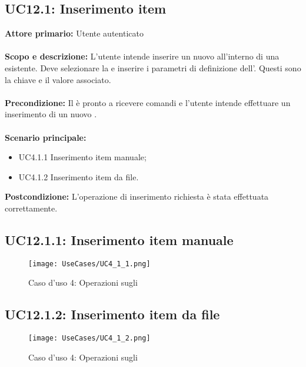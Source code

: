 \documentclass{scalatekids-article}
\begin{document}
\subsection{UC12.1: Inserimento item}

\textbf{Attore primario:} Utente autenticato\\ \\
\textbf{Scopo e descrizione:} L'utente intende inserire un nuovo  all'interno di una  esistente. Deve selezionare la  e inserire i parametri di definizione dell'. Questi sono la chiave e il valore associato.\\ \\
\textbf{Precondizione:} Il  è pronto a ricevere comandi e l'utente intende effettuare un inserimento di un nuovo .\\ \\
\textbf{Scenario principale:}
\begin{itemize}
\item UC4.1.1 Inserimento item manuale;
\item UC4.1.2 Inserimento item da file.
\end{itemize}
\textbf{Postcondizione:} L'operazione di inserimento richiesta è stata effettuata correttamente.

\subsection{UC12.1.1: Inserimento item manuale}

\begin{figure}[H]
  \begin{center}
    \texttt{[image: UseCases/UC4\_1\_1.png]}
    \caption*{Caso d'uso 4: Operazioni sugli }
  \end{center}
\end{figure}

\subsection{UC12.1.2: Inserimento item da file}

\begin{figure}[H]
  \begin{center}
    \texttt{[image: UseCases/UC4\_1\_2.png]}
    \caption*{Caso d'uso 4: Operazioni sugli }
  \end{center}
\end{figure}
\end{document}
